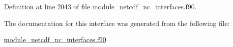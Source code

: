 Definition at line 2043 of file module\+\_\+netcdf\+\_\+nc\+\_\+interfaces.\+f90.



The documentation for this interface was generated from the following file\+:\begin{DoxyCompactItemize}
\item 
\hyperlink{module__netcdf__nc__interfaces_8f90}{module\+\_\+netcdf\+\_\+nc\+\_\+interfaces.\+f90}\end{DoxyCompactItemize}
